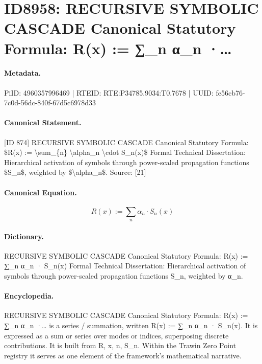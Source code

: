 \section*{ID8958: RECURSIVE SYMBOLIC CASCADE Canonical Statutory Formula: R(x) := ∑\_n α\_n ·…}
\paragraph{Metadata.}
PiID: 4960357996469 | RTEID: RTE:P34785.9034:T0.7678 | UUID: fe56cb76-7c0d-56dc-840f-67d5c6978d33

\paragraph{Canonical Statement.}
[ID 874] RECURSIVE SYMBOLIC CASCADE Canonical Statutory Formula: \$R(x) := \textbackslash{}sum\_\{n\} \textbackslash{}alpha\_n \textbackslash{}cdot S\_n(x)\$ Formal Technical Dissertation: Hierarchical activation of symbols through power-scaled propagation functions \$S\_n\$, weighted by \$\textbackslash{}alpha\_n\$. Source: [21]

\paragraph{Canonical Equation.}
\[
R(x) := \sum_{n} \alpha_n \cdot S_n(x)
\]

\paragraph{Dictionary.}
RECURSIVE SYMBOLIC CASCADE Canonical Statutory Formula: R(x) := ∑\_n α\_n · S\_n(x) Formal Technical Dissertation: Hierarchical activation of symbols through power-scaled propagation functions S\_n, weighted by α\_n.

\paragraph{Encyclopedia.}
RECURSIVE SYMBOLIC CASCADE Canonical Statutory Formula: R(x) := ∑\_n α\_n ·… is a series / summation, written R(x) := ∑\_n α\_n · S\_n(x). It is expressed as a sum or series over modes or indices, superposing discrete contributions. It is built from R, x, n, S\_n. Within the Trawin Zero Point registry it serves as one element of the framework's mathematical narrative.
